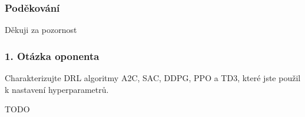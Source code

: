 \begin{frame}
    \frametitle{Poděkování}
    {
        \Large
        Děkuji za pozornost
    }
\end{frame}

\begin{frame}
    \frametitle{1. Otázka oponenta}
    \large{Charakterizujte DRL algoritmy A2C, SAC, DDPG, PPO a TD3, které jste použil k nastavení hyperparametrů.}

    TODO
%

\end{frame}

